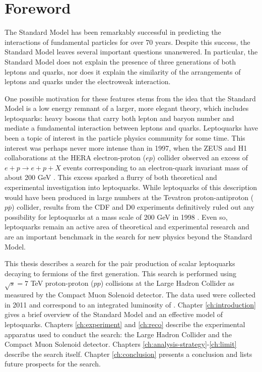 \chapter*{Foreword}

The Standard Model has been remarkably successful in predicting the interactions 
of fundamental particles for over 70 years.
Despite this success, the Standard Model leaves several
important questions unanswered.
In particular, the Standard Model does not 
explain the presence of three generations of both leptons and quarks, nor
does it explain the similarity of the arrangements of leptons and quarks
under the electroweak interaction.

One possible motivation for these features stems from the
idea that the Standard Model is a low energy remnant of a larger,
more elegant theory, which includes leptoquarks: heavy bosons
that carry both lepton and baryon number and mediate a fundamental
interaction between leptons and quarks.  Leptoquarks have been
a topic of interest in the particle physics community for some time. 
This interest was perhaps never more intense than in 
1997, when the ZEUS and H1 collaborations at the HERA electron-proton ($ep$) collider
observed an excess of $e + p \rightarrow e + p + X$ events corresponding
to an electron-quark invariant mass of about 200 GeV
\cite{hera-excess-h1,hera-excess-zeus}.
This excess sparked a flurry of both theoretical and experimental investigation into leptoquarks.
While leptoquarks of this description would have been produced in large
numbers at the Tevatron proton-antiproton ($p\overline{p}$)
collider, results from the 
CDF and D0 experiments definitively ruled out any possibility for leptoquarks
at a mass scale of 200 GeV in 1998 \cite{tevatron-refutation}.
Even so, leptoquarks remain an active area of theoretical and experimental research
and are an important benchmark in the search for new physics beyond the Standard Model.

This thesis describes a search for the pair production of scalar leptoquarks decaying to fermions of the first generation.
This search is performed using $\sqrt{s} = 7$ TeV proton-proton ($pp$) 
collisions at the Large Hadron Collider as measured 
by the Compact Muon Solenoid detector.
The data used were collected in 2011 and correspond to an integrated luminosity of \lumi.
Chapter \ref{ch:introduction} gives a brief overview of the Standard Model and 
an effective model of leptoquarks.
Chapters \ref{ch:experiment} and \ref{ch:reco} describe the experimental
apparatus used to conduct the search: the Large Hadron Collider and the 
Compact Muon Solenoid detector.
Chapters \ref{ch:analysis-strategy}-\ref{ch:limit} describe the search itself.
Chapter \ref{ch:conclusion} presents a conclusion and lists future prospects for the search.
